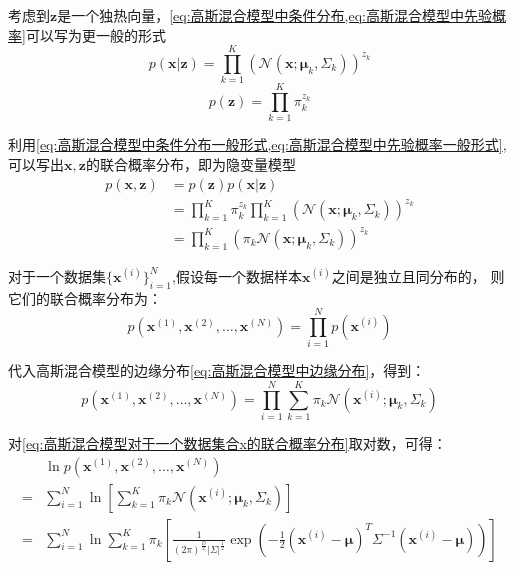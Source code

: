 \documentclass[withoutpreface,bwprint]{NoteBook}
\begin{document}
考虑到$\mathbf{z}$是一个独热向量，\cref{eq:高斯混合模型中条件分布,eq:高斯混合模型中先验概率}可以写为更一般的形式
\begin{equation}
    \label{eq:高斯混合模型中条件分布一般形式}
    p(\mathbf{x}|\mathbf{z}) = \prod_{k=1}^{K} (\mathcal{N}(\mathbf{x};\bm{\mu}_k,\Sigma_k))^{z_k}
\end{equation}
\begin{equation}
    \label{eq:高斯混合模型中先验概率一般形式}
    p(\mathbf{z}) = \prod_{k=1}^{K} \pi_k^{z_k}
\end{equation}

利用\cref{eq:高斯混合模型中条件分布一般形式,eq:高斯混合模型中先验概率一般形式},可以写出$\mathbf{x},\mathbf{z}$的联合概率分布，即为隐变量模型
\begin{align}
    \label{eq:高斯混合模型的联合概率分布}
    p(\mathbf{x},\mathbf{z}) 
    &= p(\mathbf{z}) p(\mathbf{x}|\mathbf{z})  \nonumber \\
    &= \prod_{k=1}^{K} \pi_k^{z_k} \prod_{k=1}^{K} (\mathcal{N}(\mathbf{x};\bm{\mu}_k,\Sigma_k))^{z_k} \nonumber \\
    &= \prod_{k=1}^{K} ( \pi_k  \mathcal{N}(\mathbf{x};\bm{\mu}_k,\Sigma_k))^{z_k}
\end{align}

对于一个数据集$\{\mathbf{x}^{(i)}\}_{i=1}^{N}$,假设每一个数据样本$\mathbf{x}^{(i)}$之间是独立且同分布的，
则它们的联合概率分布为：
$$
p(\mathbf{x}^{(1)},\mathbf{x}^{(2)},\dots,\mathbf{x}^{(N)}) = \prod_{i=1}^{N} p(\mathbf{x}^{(i)})
$$

代入高斯混合模型的边缘分布\cref{eq:高斯混合模型中边缘分布}，得到：
\begin{equation}
    \label{eq:高斯混合模型对于一个数据集合x的联合概率分布}
    p(\mathbf{x}^{(1)},\mathbf{x}^{(2)},\dots,\mathbf{x}^{(N)}) = \prod_{i=1}^{N} \sum_{k=1}^{K} \pi_k  \mathcal{N}(\mathbf{x}^{(i)};\bm{\mu}_k,\Sigma_k)
\end{equation}

对\cref{eq:高斯混合模型对于一个数据集合x的联合概率分布}取对数，可得：
\begin{align}
    \label{eq:高斯混合模型对于一个数据集合x的联合概率分布_log}
    &\ln p(\mathbf{x}^{(1)},\mathbf{x}^{(2)},\dots,\mathbf{x}^{(N)}) \nonumber \\
    =& \sum_{i=1}^{N} \ln \left [ \sum_{k=1}^{K} \pi_k  \mathcal{N}(\mathbf{x}^{(i)};\bm{\mu}_k,\Sigma_k) \right ]  \nonumber \\
    =& \sum_{i=1}^{N} \ln \sum_{k=1}^{K} \pi_k \left [ \frac{1}{(2\pi)^{\frac{D}{2}} \left |{\Sigma}\right |^{\frac{1}{2}}} \exp\left(-\frac{1}{2}(\mathbf{x}^{(i)}-\bm{\mu})^T\Sigma^{-1}(\mathbf{x}^{(i)}-\bm{\mu})\right) \right ]
\end{align}
\end{document}
